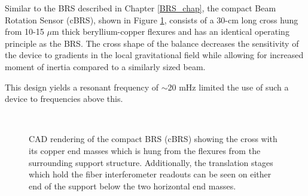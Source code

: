 \documentclass [12pt, proquest]{uwthesis}[2019]
\begin{document}
Similar to the BRS described in Chapter \ref{BRS_chap}, the compact Beam Rotation Sensor (cBRS), shown in Figure \ref{cBRS}, consists of a 30-cm long cross hung from 10-15 $\mu$m thick beryllium-copper flexures and has an identical operating principle as the BRS. The cross shape of the balance decreases the sensitivity of the device to gradients in the local gravitational field while allowing for increased moment of inertia compared to a similarly sized beam. 

This design yields a resonant frequency of $\sim$20 mHz limited the use of such a device to frequencies above this. 

\begin{figure}%
\begin{center}
\\
\caption{CAD rendering of the compact BRS (cBRS) showing the cross with its copper end masses which is hung from the flexures from the surrounding support structure. Additionally, the translation stages which hold the fiber interferometer readouts can be seen on either end of the support below the two horizontal end masses.}
\label{cBRS}
\end{center}
\end{figure}
\end{document}
